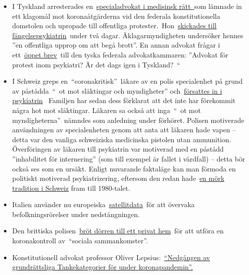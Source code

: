 \begin{itemize}
\tightlist
\item
  I Tyskland arresterades
  en~\href{http://beatebahner.de/}{specialadvokat i medisinsk rätt~}som
  lämnade in ett klagomål mot koronaåtgärderna vid den federala
  konstitutionella domstolen och upropade till offentliga
  protester.~Hon~\href{https://www.rnz.de/nachrichten/heidelberg_artikel,-nach-aufruf-zu-corona-demo-heidelberger-anwaeltin-in-psychiatrischer-einrichtung-update-_arid,508747.html}{skickades
  till fängelsepsykiatrin}~under två dagar. Åklagarmyndigheten
  undersöker hennes ''en offentliga upprop om att begå brott''. En annan
  advokat frågar i
  ett~\href{https://www.nachrichtenspiegel.de/2020/04/14/brief-an-die-bundesrechtsanwaltskammer-in-causa-bahmer/}{öppet
  brev}~till den tyska federala advokatkammaren: ''Advokat för protest
  inom psykiatri? Är det dags igen i Tyskland?~``
\item
  I Schweiz greps en~``coronakritisk''~läkare av en polis specialenhet
  på grund av påstådda~``~ot mot släktingar och myndigheter''
  och~\href{https://www.srf.ch/news/regional/aargau-solothurn/festnahme-von-corona-kritiker-verschwoerung-oder-normale-intervention-der-aargauer-behoerden}{försattes
  in i psykiatrin}~ Familjen har sedan dess förklarat att det inte har
  förekommit några hot mot släktingar. Läkaren sa också att inga~``~ot
  mot myndigheterna''~nämndes som anledning under förhöret. Polisen
  motiverade användningen av specialenheten genom att anta att läkaren
  hade vapen -- detta var den vanliga schweiziska medicinska pistolen
  utan ammunition. Överföringen av läkaren till psykiatrin var motiverad
  med en påstådd ''inhabilitet för internering'' (som till exempel är
  fallet i vårdfall) -- detta bör också ses som en ursäkt. Enligt
  nuvarande faktaläge kan man förmoda en politiskt motiverad
  psykiatrizering, eftersom den redan
  hade~\href{https://www.revue.ch/ausgaben/2019/06/detail/news/detail/News/als-die-schweiz-arme-und-unangepasste-wegsperrte-1/}{en
  mörk tradition i Schweiz} fram till 1980-talet.
\item
  Italien använder nu
  europeiska~\href{https://www.ansa.it/english/news/2020/04/06/coronavirus-italy-activates-satellite-to-monitor-nation-3_f2ffb30c-d550-42f5-82fc-ec1f82c5c625.html}{satellitdata}~för
  att övervaka befolkningsrörelser under nedstängningen.
\item
  Den brittiska
  polisen~\href{https://twitter.com/BanTheBBC/status/1249598512427347969}{bröt
  dörren till ett privat hem}~för att utföra en koronakontroll
  av~``sociala sammankomster''.
\item
  Konstitutionell advokat professor Oliver
  Lepsius:~\href{https://verfassungsblog.de/vom-niedergang-grundrechtlicher-denkkategorien-in-der-corona-pandemie/}{``Nedgången
  av grundrättsliga Tankekategorier för under koronapandemin''.}
\end{itemize}

